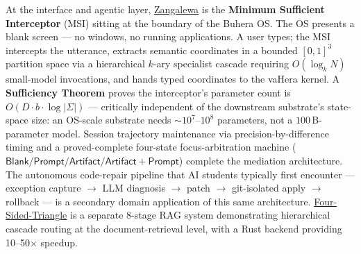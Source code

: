 \documentclass[12pt,a4paper]{article}
\begin{document}
At the interface and agentic layer,
\href{https://github.com/fullscreen-triangle/zangalewa}{Zangalewa} is the
\textbf{Minimum Sufficient Interceptor} (MSI) sitting at the boundary of the Buhera OS.
The OS presents a blank screen --- no windows, no running applications.
A user types; the MSI intercepts the utterance, extracts semantic coordinates in a
bounded $[0,1]^3$ partition space via a hierarchical $k$-ary specialist cascade
requiring $O(\log_k N)$ small-model invocations, and hands typed coordinates to the
vaHera kernel.
A \textbf{Sufficiency Theorem} proves the interceptor's parameter count is
$O(D \cdot b \cdot \log|\Sigma|)$ --- critically independent of the downstream
substrate's state-space size: an OS-scale substrate needs ${\sim}10^7$--$10^8$
parameters, not a $100\,$B-parameter model.
Session trajectory maintenance via precision-by-difference timing and a proved-complete
four-state focus-arbitration machine ($\mathsf{Blank}/\mathsf{Prompt}/\mathsf{Artifact}/\mathsf{Artifact+Prompt}$)
complete the mediation architecture.
The autonomous code-repair pipeline that AI students typically first encounter ---
exception capture $\to$ LLM diagnosis $\to$ patch $\to$ git-isolated apply $\to$
rollback --- is a secondary domain application of this same architecture.
\href{https://github.com/fullscreen-triangle/four-sided-triangle}{Four-Sided-Triangle}
is a separate 8-stage RAG system demonstrating hierarchical cascade routing at the
document-retrieval level, with a Rust backend providing 10--50$\times$ speedup.
\end{document}

